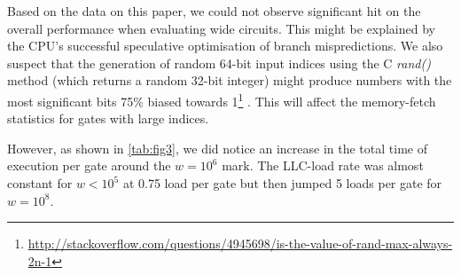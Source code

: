 Based on the data on this paper, we could not observe significant hit on the overall performance when evaluating wide circuits. This might be explained by the CPU's successful speculative optimisation of branch mispredictions. We also suspect that the generation of random 64-bit input indices using the C \textit{rand()} method (which returns a random 32-bit integer) might produce numbers with the most significant bits 75\% biased towards 1\footnote{\url{http://stackoverflow.com/questions/4945698/is-the-value-of-rand-max-always-2n-1}}
. This will affect the memory-fetch statistics for gates with large indices.
\par
However, as shown in \ref{tab:fig3}, we did notice an increase in the total time of execution per gate around the $w = 10^6$ mark. The LLC-load rate was almost constant for $w < 10^5 $ at 0.75 load per gate but then jumped 5 loads per gate for $w = 10^8$.

